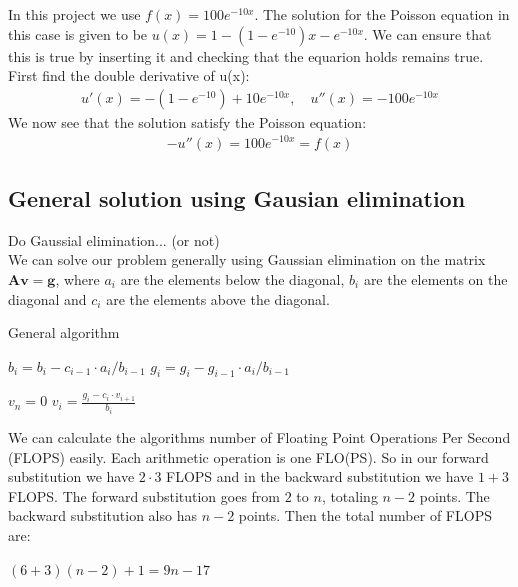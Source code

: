 \documentclass[american,a4paper,12pt]{article}
\renewcommand{\vec}[1]{\mathbf{#1}} %
\begin{document}
  In this project we use $f(x) = 100e^{-10x}$. The solution for the Poisson equation in this case is given to be $u(x) = 1 - (1 - e^{-10})x - e^{-10x}$. We can ensure that this is true by inserting it and checking that the equarion holds remains true. First find the double derivative of u(x):
  \begin{align*}
    u'(x) = -(1 - e^{-10}) + 10e^{-10x}, \quad u''(x) = -100e^{-10x}
  \end{align*}
  We now see that the solution satisfy the Poisson equation:
  \begin{align*}
    -u''(x) = 100e^{-10x} = f(x)
  \end{align*}

\subsection{General solution using Gausian elimination}
Do Gaussial elimination... (or not)\\
We can solve our problem generally using Gaussian elimination on the matrix $\vec{A}\vec{v} = \vec{g}$, where $a_i$ are the elements below the diagonal, $b_i$ are the elements on the diagonal and $c_i$ are the elements above the diagonal.

\begin{algorithm}
\caption{General algorithm}
\begin{algorithmic}[1] %
   
    \State $b_i = b_i - c_{i-1}\cdot {a_i}/{{b}_{i-1}}$ 
    \State $g_i = g_i - {g}_{i-1}\cdot {a_i}/{{b}_{i-1}}$ 
  \EndFor

  \Statex
  \State $v_n = 0$ 
    \State $v_i = \frac{g_i - c_i\cdot v_{i+1}}{b_i}$
  \EndFor
\end{algorithmic}
\end{algorithm}

We can calculate the algorithms number of Floating Point Operations Per Second (FLOPS) easily. Each arithmetic operation is one FLO(PS). So in our forward substitution we have $2 \cdot 3$ FLOPS and in the backward substitution we have $1+3$ FLOPS. The forward substitution goes from $2$ to $n$, totaling $n-2$ points. The backward substitution also has $n-2$ points. Then the total number of FLOPS are:
\begin{center}
    $(6+3)(n-2)+1 = 9n-17$
\end{center}
\end{document}
